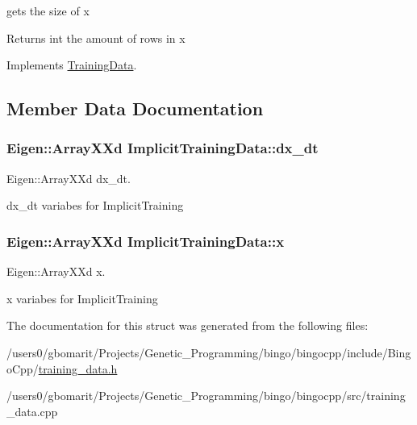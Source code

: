 gets the size of x 

\begin{DoxyReturn}{Returns}
int the amount of rows in x 
\end{DoxyReturn}


Implements \hyperlink{structTrainingData_a9be21e878961cc347e6820eb34db0a1b}{Training\+Data}.



\subsection{Member Data Documentation}
\subsubsection[{\texorpdfstring{dx\+\_\+dt}{dx_dt}}]{\setlength{\rightskip}{0pt plus 5cm}Eigen\+::\+Array\+X\+Xd Implicit\+Training\+Data\+::dx\+\_\+dt}\hypertarget{structImplicitTrainingData_a46e7205b1b43da1e0b6b582b3d127a2e}{}\label{structImplicitTrainingData_a46e7205b1b43da1e0b6b582b3d127a2e}


Eigen\+::\+Array\+X\+Xd dx\+\_\+dt. 

dx\+\_\+dt variabes for Implicit\+Training 
\subsubsection[{\texorpdfstring{x}{x}}]{\setlength{\rightskip}{0pt plus 5cm}Eigen\+::\+Array\+X\+Xd Implicit\+Training\+Data\+::x}\hypertarget{structImplicitTrainingData_a7d797c666ce6c25d2f816e01ed4f3aed}{}\label{structImplicitTrainingData_a7d797c666ce6c25d2f816e01ed4f3aed}


Eigen\+::\+Array\+X\+Xd x. 

x variabes for Implicit\+Training 

The documentation for this struct was generated from the following files\+:\begin{DoxyCompactItemize}
\item 
/users0/gbomarit/\+Projects/\+Genetic\+\_\+\+Programming/bingo/bingocpp/include/\+Bingo\+Cpp/\hyperlink{training__data_8h}{training\+\_\+data.\+h}\item 
/users0/gbomarit/\+Projects/\+Genetic\+\_\+\+Programming/bingo/bingocpp/src/training\+\_\+data.\+cpp\end{DoxyCompactItemize}
